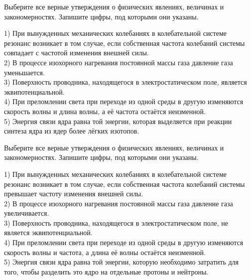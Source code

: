 \begin{taskbasic}[code={\label{task:kim18_img11}}]
Выберите все верные утверждения о физических явлениях, величинах и закономерностях. Запишите цифры, под которыми они указаны.

1) При вынужденных механических колебаниях в колебательной системе резонанс возникает в том случае, если собственная частота колебаний системы совпадает с частотой изменения внешней силы.\\
2) В процессе изохорного нагревания постоянной массы газа давление газа уменьшается.\\
3) Поверхность проводника, находящегося в электростатическом поле, является эквипотенциальной.\\
4) При преломлении света при переходе из одной среды в другую изменяются скорость волны и длина волны, а её частота остаётся неизменной.\\
5) Энергия связи ядра равна той энергии, которая выделяется при реакции синтеза ядра из ядер более лёгких изотопов.

\end{taskbasic}

\begin{taskbasic}[code={\label{task:kim18_img12}}]
Выберите все верные утверждения о физических явлениях, величинах и закономерностях. Запишите цифры, под которыми они указаны.

1) При вынужденных механических колебаниях в колебательной системе резонанс возникает в том случае, если собственная частота колебаний системы превышает частоту изменения внешней силы.\\
2) В процессе изохорного нагревания постоянной массы газа давление газа увеличивается.\\
3) Поверхность проводника, находящегося в электростатическом поле, не является эквипотенциальной.\\
4) При преломлении света при переходе из одной среды в другую изменяются скорость волны и частота, а длина её волны остаётся неизменной.\\
5) Энергия связи ядра равна той энергии, которую необходимо затратить для того, чтобы разделить это ядро на отдельные протоны и нейтроны.

\end{taskbasic}

